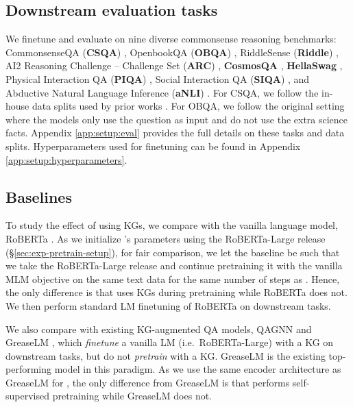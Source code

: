 \subsection{Downstream evaluation tasks}
\label{sec:exp-eval}

We finetune and evaluate \methodname on nine diverse commonsense reasoning benchmarks: 
{CommonsenseQA (\textbf{CSQA})} \cite{talmor2018commonsenseqa},
{OpenbookQA (\textbf{OBQA})} \cite{obqa}, 
{RiddleSense (\textbf{Riddle})} \cite{lin2021riddlesense},
{AI2 Reasoning Challenge\! --\! Challenge Set (\textbf{ARC})} \cite{clark2018think},
{\textbf{CosmosQA}} \cite{huang2019cosmos},
{\textbf{HellaSwag}} \cite{zellers2019hellaswag},
{Physical Interaction QA (\textbf{PIQA})} \cite{bisk2020piqa},
{Social Interaction QA (\textbf{SIQA})} \cite{sap2019socialiqa}, and
{Abductive Natural Language Inference (\textbf{aNLI})} \cite{bhagavatula2019abductive}. 
For CSQA, we follow the in-house data splits used by prior works \cite{lin2019kagnet}. For OBQA, we follow the original setting where the models only use the question as input and do not use the extra science facts.
Appendix \ref{app:setup:eval} provides the full details on these tasks and data splits.
Hyperparameters used for finetuning can be found in Appendix \ref{app:setup:hyperparameters}.




\subsection{Baselines}
\label{sec:exp-baseline}


To study the effect of using KGs, we compare \methodname with the vanilla language model, RoBERTa \cite{liu2019roberta}. 
As we initialize \methodname's parameters using the RoBERTa-Large release (\S \ref{sec:exp-pretrain-setup}), for fair comparison, we let the baseline be such that we take the RoBERTa-Large release and continue pretraining it with the vanilla MLM objective on the same text data for the same number of steps as \methodname. Hence, the only difference is that \methodname uses KGs during pretraining while RoBERTa does not.
We then perform standard LM finetuning of RoBERTa on downstream tasks.


We also compare with existing KG-augmented QA models, QAGNN \cite{yasunaga2021qa} and GreaseLM \cite{zhang2022greaselm}, which \textit{finetune} a vanilla LM (i.e.~RoBERTa-Large) with a KG on downstream tasks, but do not \textit{pretrain} with a KG. GreaseLM is the existing top-performing model in this paradigm.
As we use the same encoder architecture as GreaseLM for \methodname, the only difference from GreaseLM is that \methodname performs self-supervised pretraining while GreaseLM does not.







